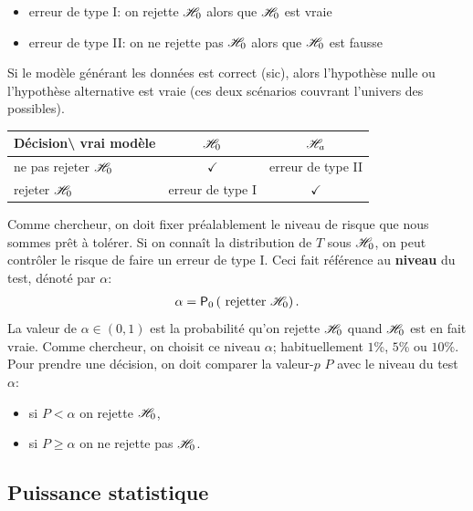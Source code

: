 \documentclass[
  11pt,
  letterpaper,
]{book}
\providecommand{\tightlist}{%
  \setlength{\itemsep}{0pt}\setlength{\parskip}{0pt}}
\begin{document}
\begin{itemize}
\tightlist
\item
  erreur de type I: on rejette \(\Hy_0\) alors que \(\Hy_0\) est vraie
\item
  erreur de type II: on ne rejette pas \(\Hy_0\) alors que \(\Hy_0\) est fausse
\end{itemize}

Si le modèle générant les données est correct (sic), alors l'hypothèse nulle ou l'hypothèse alternative est vraie (ces deux scénarios couvrant l'univers des possibles).

\begin{longtable}[]{@{}lcc@{}}
\toprule
Décision\textbackslash{} vrai modèle & \(\Hy_0\) & \(\Hy_a\)\tabularnewline
\midrule
\endhead
ne pas rejeter \(\Hy_0\) & \(\checkmark\) & erreur de type II\tabularnewline
rejeter \(\Hy_0\) & erreur de type I & \(\checkmark\)\tabularnewline
\bottomrule
\end{longtable}

Comme chercheur, on doit fixer préalablement le niveau de risque que nous sommes prêt à tolérer. Si on connaît la distribution de \(T\) sous \(\Hy_0\), on peut contrôler le risque de faire un erreur de type I. Ceci fait référence au \textbf{niveau} du test, dénoté par \(\alpha\):
\begin{align*}
\alpha = \pr[0]{\text{ rejetter } \Hy_0}.
\end{align*}
La valeur de \(\alpha \in (0, 1)\) est la probabilité qu'on rejette \(\Hy_0\) quand \(\Hy_0\) est en fait vraie. Comme chercheur, on choisit ce niveau \(\alpha\); habituellement \(1\)\%, \(5\)\% ou \(10\)\%. Pour prendre une décision, on doit comparer la valeur-\(p\) \(P\) avec le niveau du test \(\alpha\):

\begin{itemize}
\tightlist
\item
  si \(P < \alpha\) on rejette \(\Hy_0\),
\item
  si \(P \geq \alpha\) on ne rejette pas \(\Hy_0\).
\end{itemize}

\hypertarget{puissance-statistique}{%
\subsection{Puissance statistique}\label{puissance-statistique}}
\end{document}
